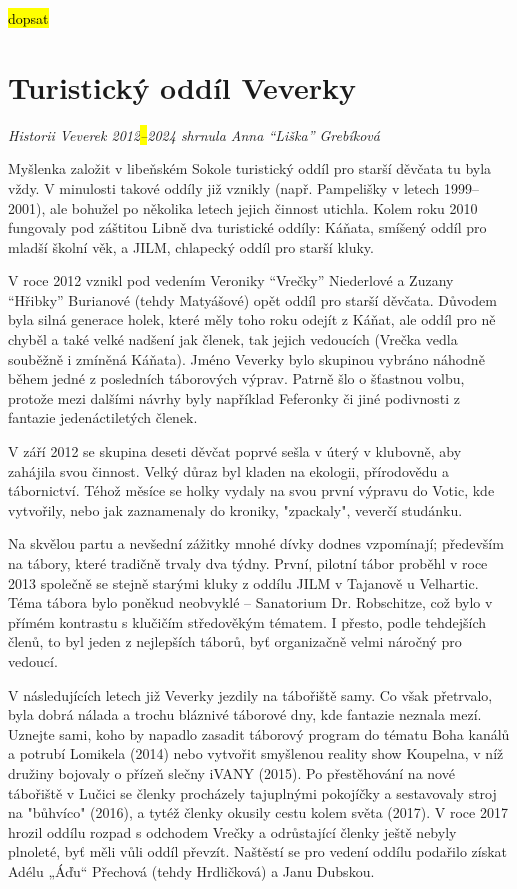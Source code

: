 \hl{dopsat}

\section{Turistický oddíl Veverky}\label{turistickuxfd-odduxedl-veverky}

\emph{Historii Veverek 2012\hl{--}2024 shrnula Anna ``Liška'' Grebíková}

Myšlenka založit v libeňském Sokole turistický oddíl pro starší děvčata
tu byla vždy. V minulosti takové oddíly již vznikly (např. Pampelišky v
letech 1999--2001), ale bohužel po několika letech jejich činnost
utichla. Kolem roku 2010 fungovaly pod záštitou Libně dva turistické
oddíly: Káňata, smíšený oddíl pro mladší školní věk, a JILM, chlapecký
oddíl pro starší kluky.

V roce 2012 vznikl pod vedením Veroniky ``Vrečky'' Niederlové a Zuzany
``Hřibky'' Burianové (tehdy Matyášové) opět oddíl pro starší děvčata.
Důvodem byla silná generace holek, které měly toho roku odejít z Káňat,
ale oddíl pro ně chyběl a také velké nadšení jak členek, tak jejich
vedoucích (Vrečka vedla souběžně i zmíněná Káňata). Jméno Veverky bylo
skupinou vybráno náhodně během jedné z posledních táborových výprav.
Patrně šlo o šťastnou volbu, protože mezi dalšími návrhy byly například
Feferonky či jiné podivnosti z fantazie jedenáctiletých členek.

V září 2012 se skupina deseti děvčat poprvé sešla v úterý v klubovně,
aby zahájila svou činnost. Velký důraz byl kladen na ekologii,
přírodovědu a tábornictví. Téhož měsíce se holky vydaly na svou první
výpravu do Votic, kde vytvořily, nebo jak zaznamenaly do kroniky,
"zpackaly", veverčí studánku.

Na skvělou partu a nevšední zážitky mnohé dívky dodnes vzpomínají;
především na tábory, které tradičně trvaly dva týdny. První, pilotní
tábor proběhl v roce 2013 společně se stejně starými kluky z oddílu JILM
v Tajanově u Velhartic. Téma tábora bylo poněkud neobvyklé -- Sanatorium
Dr. Robschitze, což bylo v přímém kontrastu s klučičím středověkým
tématem. I přesto, podle tehdejších členů, to byl jeden z nejlepších
táborů, byť organizačně velmi náročný pro vedoucí.

V následujících letech již Veverky jezdily na tábořiště samy. Co však
přetrvalo, byla dobrá nálada a trochu bláznivé táborové dny, kde
fantazie neznala mezí. Uznejte sami, koho by napadlo zasadit táborový
program do tématu Boha kanálů a potrubí Lomikela (2014) nebo vytvořit
smyšlenou reality show Koupelna, v níž družiny bojovaly o přízeň slečny
iVANY (2015). Po přestěhování na nové tábořiště v Lučici se členky
procházely tajuplnými pokojíčky a sestavovaly stroj na "bůhvíco" (2016),
a tytéž členky okusily cestu kolem světa (2017). V roce 2017 hrozil
oddílu rozpad s odchodem Vrečky a odrůstající členky ještě nebyly
plnoleté, byť měli vůli oddíl převzít. Naštěstí se pro vedení oddílu
podařilo získat Adélu „Áďu`` Přechová (tehdy Hrdličková) a Janu Dubskou.

